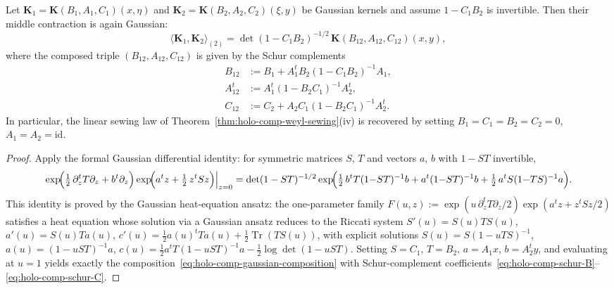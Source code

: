 \begin{theorem}
\label{thm:holo-comp-gaussian-composition}
Let $\mathbf{K}_1 = \mathbf{K}(B_1, A_1, C_1)(x, \eta)$ and
$\mathbf{K}_2 = \mathbf{K}(B_2, A_2, C_2)(\xi, y)$ be Gaussian
kernels and assume $1 - C_1 B_2$ is invertible. Then their middle
contraction is again Gaussian:
\begin{equation}\label{eq:holo-comp-gaussian-composition}
\langle \mathbf{K}_1, \mathbf{K}_2 \rangle_{(2)}
=
\det(1 - C_1 B_2)^{-1/2}\,
\mathbf{K}(B_{12}, A_{12}, C_{12})(x, y),
\end{equation}
where the composed triple $(B_{12}, A_{12}, C_{12})$ is given by
the Schur complements
\begin{align}
B_{12} &:= B_1 + A_1^t B_2(1 - C_1 B_2)^{-1} A_1,
\label{eq:holo-comp-schur-B} \\
A_{12}^t &:= A_1^t(1 - B_2 C_1)^{-1} A_2^t,
\label{eq:holo-comp-schur-A} \\
C_{12} &:= C_2 + A_2 C_1(1 - B_2 C_1)^{-1} A_2^t.
\label{eq:holo-comp-schur-C}
\end{align}
In particular, the linear sewing law of
Theorem~\textup{\ref{thm:holo-comp-weyl-sewing}(iv)} is recovered
by setting $B_1 = C_1 = B_2 = C_2 = 0$, $A_1 = A_2 = \mathrm{id}$.
\end{theorem}

\begin{proof}
Apply the formal Gaussian differential identity: for symmetric
matrices $S$, $T$ and vectors $a$, $b$ with $1 - ST$ invertible,
\[
\left.
\exp\!\Bigl(\tfrac{1}{2}\,\partial_z^t T \partial_z
+ b^t \partial_z\Bigr)
\exp\!\Bigl(a^t z + \tfrac{1}{2}\, z^t S z\Bigr)
\right|_{z=0}
=
\det(1 - ST)^{-1/2}
\exp\!\Bigl(\tfrac{1}{2}\, b^t T(1{-}ST)^{-1} b
+ a^t(1{-}ST)^{-1} b
+ \tfrac{1}{2}\, a^t S(1{-}TS)^{-1} a\Bigr).
\]
This identity is proved by the Gaussian heat-equation ansatz: the
one-parameter family
$F(u,z) := \exp(u\,\partial_z^t T \partial_z/2)
\exp(a^t z + z^t S z / 2)$
satisfies a heat equation whose solution via a Gaussian ansatz
reduces to the Riccati system $S'(u) = S(u) T S(u)$,
$a'(u) = S(u) T a(u)$,
$c'(u) = \tfrac{1}{2} a(u)^t T a(u)
+ \tfrac{1}{2}\operatorname{Tr}(T S(u))$,
with explicit solutions
$S(u) = S(1 - uTS)^{-1}$,
$a(u) = (1 - uST)^{-1} a$,
$c(u) = \tfrac{1}{2} a^t T(1 - uST)^{-1} a
- \tfrac{1}{2}\log\det(1 - uST)$.
Setting $S = C_1$, $T = B_2$, $a = A_1 x$, $b = A_2^t y$, and
evaluating at $u = 1$ yields exactly the
composition~\eqref{eq:holo-comp-gaussian-composition} with
Schur-complement
coefficients~\eqref{eq:holo-comp-schur-B}--\eqref{eq:holo-comp-schur-C}.
\end{proof}

